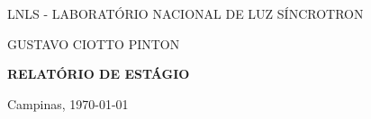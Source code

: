 \begin{center}


\vspace*{12pt}

LNLS - LABORATÓRIO NACIONAL DE LUZ SÍNCROTRON

\vspace*{.30\textheight}

{\Large GUSTAVO CIOTTO PINTON}

\vspace*{72pt}

\textbf{\Large RELATÓRIO DE ESTÁGIO} \\ \vspace{12pt}

\vspace*{.40\textheight}
 
Campinas, \today

\end{center}

\newpage 
